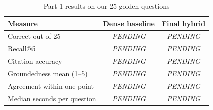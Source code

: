 \begin{table}[!t]
\centering
\caption{Part 1 results on our 25 golden questions}
\label{tab:p1}
\begin{tabular}{lcc}
\hline
Measure & Dense baseline & Final hybrid \\
\hline
Correct out of 25 & \textit{PENDING} & \textit{PENDING} \\
Recall@5 & \textit{PENDING} & \textit{PENDING} \\
Citation accuracy & \textit{PENDING} & \textit{PENDING} \\
Groundedness mean (1--5) & \textit{PENDING} & \textit{PENDING} \\
Agreement within one point & \textit{PENDING} & \textit{PENDING} \\
Median seconds per question & \textit{PENDING} & \textit{PENDING} \\
\hline
\end{tabular}
\end{table}
